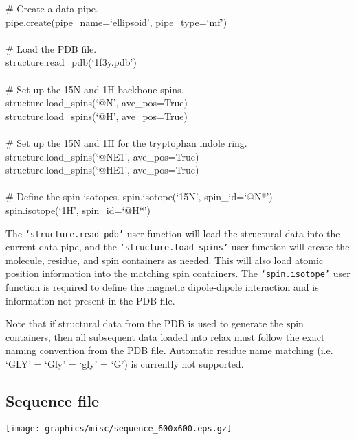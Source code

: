 \begin{exampleenv}
\# Create a data pipe. \\
pipe.create(pipe\_name=`ellipsoid', pipe\_type=`mf') \\
 \\
\# Load the PDB file. \\
structure.read\_pdb(`1f3y.pdb') \\
 \\
\# Set up the 15N and 1H backbone spins. \\
structure.load\_spins(`@N', ave\_pos=True) \\
structure.load\_spins(`@H', ave\_pos=True) \\
 \\
\# Set up the 15N and 1H for the tryptophan indole ring. \\
structure.load\_spins(`@NE1', ave\_pos=True) \\
structure.load\_spins(`@HE1', ave\_pos=True) \\
 \\
\# Define the spin isotopes.
spin.isotope(`15N', spin\_id=`@N*') \\
spin.isotope(`1H', spin\_id=`@H*')
\end{exampleenv}

The \texttt{`structure.read\_pdb'} user function will load the structural data into the current data pipe, and the \texttt{`structure.load\_spins'} user function will create the molecule, residue, and spin containers as needed.  This will also load atomic position information into the matching spin containers.  The \texttt{`spin.isotope'} user function is required to define the magnetic dipole-dipole interaction and is information not present in the PDB file.

Note that if structural data from the PDB is used to generate the spin containers, then all subsequent data loaded into relax must follow the exact naming convention from the PDB file.  Automatic residue name matching (i.e. `GLY' = `Gly' = `gly' = `G') is currently not supported.




\subsection{Sequence file} \label{sect: script - sequence file}

\begin{figure*}[h]
\texttt{[image: graphics/misc/sequence\_600x600.eps.gz]}
\end{figure*}

